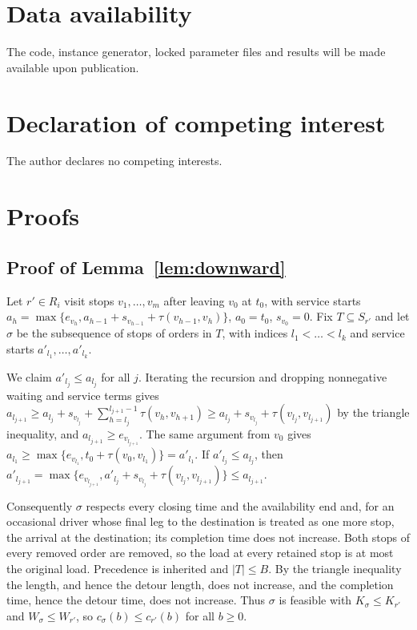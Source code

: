 \documentclass[review,12pt]{elsarticle}
\theoremstyle{definition}
\theoremstyle{remark}
\begin{document}
\section*{Data availability}
The code, instance generator, locked parameter files and results will be
made available upon publication.

\section*{Declaration of competing interest}
The author declares no competing interests.

\appendix
\section{Proofs}
\label{app:proofs}

\subsection{Proof of Lemma~\ref{lem:downward}}
\label{app:downward}

Let $r'\in R_i$ visit stops $v_1,\dots,v_m$ after leaving $v_0$ at $t_0$,
with service starts $a_h=\max\{e_{v_h},a_{h-1}+s_{v_{h-1}}+\tau(v_{h-1},v_h)\}$,
$a_0=t_0$, $s_{v_0}=0$. Fix $T\subseteq S_{r'}$ and let $\sigma$ be the
subsequence of stops of orders in $T$, with indices $l_1<\dots<l_k$ and
service starts $a'_{l_1},\dots,a'_{l_k}$.

We claim $a'_{l_j}\le a_{l_j}$ for all $j$. Iterating the recursion and
dropping nonnegative waiting and service terms gives
$a_{l_{j+1}}\ge a_{l_j}+s_{v_{l_j}}+\sum_{h=l_j}^{l_{j+1}-1}\tau(v_h,v_{h+1})
\ge a_{l_j}+s_{v_{l_j}}+\tau(v_{l_j},v_{l_{j+1}})$ by the triangle inequality,
and $a_{l_{j+1}}\ge e_{v_{l_{j+1}}}$. The same argument from $v_0$ gives
$a_{l_1}\ge\max\{e_{v_{l_1}},t_0+\tau(v_0,v_{l_1})\}=a'_{l_1}$. If
$a'_{l_j}\le a_{l_j}$, then
$a'_{l_{j+1}}=\max\{e_{v_{l_{j+1}}},a'_{l_j}+s_{v_{l_j}}+\tau(v_{l_j},v_{l_{j+1}})\}\le a_{l_{j+1}}$.

Consequently $\sigma$ respects every closing time and the availability end
and, for an occasional driver whose final leg to the destination is treated
as one more stop, the arrival at the destination; its completion time does
not increase. Both stops of every removed order are removed, so the load at
every retained stop is at most the original load. Precedence is inherited
and $|T|\le B$. By the triangle inequality the length, and hence the detour
length, does not increase, and the completion time, hence the detour time,
does not increase. Thus $\sigma$ is feasible with $K_\sigma\le K_{r'}$ and
$W_\sigma\le W_{r'}$, so $c_\sigma(b)\le c_{r'}(b)$ for all $b\ge 0$.
\end{document}
